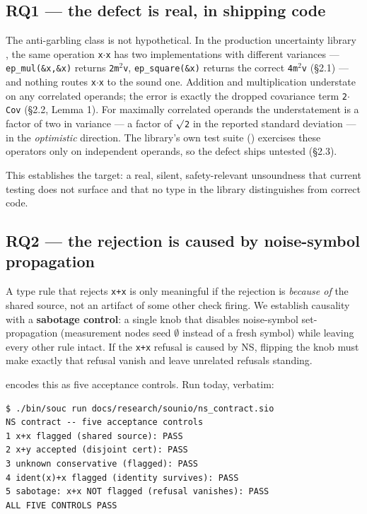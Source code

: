 \documentclass[sigplan,review,anonymous,10pt]{acmart}
\begin{document}
\subsection{RQ1 --- the defect is real, in shipping code}

The anti-garbling class is not hypothetical. In the production uncertainty library , the same operation \texttt{x$\cdot$x} has two implementations with different variances --- \texttt{ep\_mul(\&x,\&x)} returns \texttt{2m$^{2}$v}, \texttt{ep\_square(\&x)} returns the correct \texttt{4m$^{2}$v} (§2.1) --- and nothing routes \texttt{x$\cdot$x} to the sound one. Addition and multiplication understate on any correlated operands; the error is exactly the dropped covariance term \texttt{2$\cdot$Cov} (§2.2, Lemma 1). For maximally correlated operands the understatement is a factor of two in variance --- a factor of \texttt{$\surd$2} in the reported standard deviation --- in the \emph{optimistic} direction. The library's own test suite () exercises these operators only on independent operands, so the defect ships untested (§2.3).

This establishes the target: a real, silent, safety-relevant unsoundness that current testing does not surface and that no type in the library distinguishes from correct code.

\subsection{RQ2 --- the rejection is caused by noise-symbol propagation}

A type rule that rejects \texttt{x+x} is only meaningful if the rejection is \emph{because of} the shared source, not an artifact of some other check firing. We establish causality with a \textbf{sabotage control}: a single knob that disables noise-symbol set-propagation (measurement nodes seed \texttt{$\emptyset$} instead of a fresh symbol) while leaving every other rule intact. If the \texttt{x+x} refusal is caused by NS, flipping the knob must make exactly that refusal vanish and leave unrelated refusals standing.

 encodes this as five acceptance controls. Run today, verbatim:

\begin{lstlisting}
$ ./bin/souc run docs/research/sounio/ns_contract.sio
NS contract -- five acceptance controls
1 x+x flagged (shared source): PASS
2 x+y accepted (disjoint cert): PASS
3 unknown conservative (flagged): PASS
4 ident(x)+x flagged (identity survives): PASS
5 sabotage: x+x NOT flagged (refusal vanishes): PASS
ALL FIVE CONTROLS PASS
\end{lstlisting}
\end{document}
